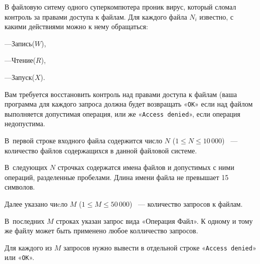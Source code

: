 В файловую ситему одного суперкомпютера проник вирус, который сломал контроль за правами доступа к файлам. Для каждого файла $N_i$ известно, с какими действиями можно к нему обращаться: 

	---Запись($W$),

	---Чтение($R$), 

	---Запуск($X$). 

Вам требуется восстановить контроль над правами доступа к файлам (ваша программа для каждого запроса должна будет возвращать «\texttt{OK}» если над файлом выполняется допустимая операция, или  же «\texttt{Access denied}», если операция недопустима.


\InputFile
В~первой строке входного файла содержится  число $N$ ($1 \leqslant N \leqslant 10\,000$)	~--- количество файлов содержащихся в данной файловой системе.

В~следующих $N$ строчках содержатся имена файлов и допустимых с ними операций, разделенные пробелами. Длина имени файла не превышает 15 символов.

Далее указано чиcло $M$ ($1 \leqslant M \leqslant 50\,000$) ~--- количество запросов к файлам.

В~последних $M$ строках указан запрос вида «Операция Файл». К одному и тому же файлу может быть применено любое колличество запросов.

\OutputFile
Для каждого из $M$ запросов нужно вывести в отдельной строке «\texttt{Access denied}» или «\texttt{OK}».

